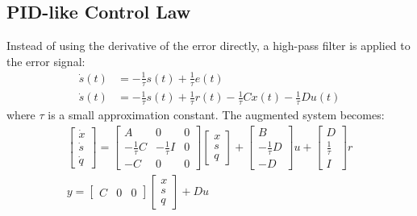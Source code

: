 \subsection*{PID-like Control Law}
Instead of using the derivative of the error directly, a high-pass filter is applied to the error signal:
\begin{align*}
\dot{s}(t)&=- \frac{1}{\tau} s(t)+ \frac{1}{\tau} e(t)\\
\dot{s}(t)&=- \frac{1}{\tau} s(t)+ \frac{1}{\tau} r(t)-\frac{1}{\tau}Cx(t)-\frac{1}{\tau}Du(t)
\end{align*}
where $\tau$ is a small approximation constant. The augmented system becomes:
\begin{align*}
\begin{bmatrix}\dot{x}\\\dot{s}\\\dot{q}\end{bmatrix}=\begin{bmatrix}A & 0 & 0\\-\frac{1}{\tau}C & -\frac{1}{\tau}I & 0\\-C & 0 & 0\end{bmatrix}\begin{bmatrix}x\\s\\q\end{bmatrix}+\begin{bmatrix}B\\-\frac{1}{\tau}D\\-D\end{bmatrix}u+\begin{bmatrix}D\\\frac{1}{\tau}\\I\end{bmatrix}r\\
y=\begin{bmatrix}C & 0 & 0\end{bmatrix}\begin{bmatrix}x\\s\\q\end{bmatrix}+Du
\end{align*}